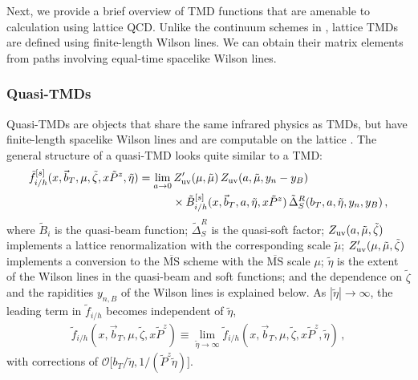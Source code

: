 \documentclass[11pt,a4paper]{article}
\newcommand{\MSbar}{{\overline{\mathrm{MS}}}}
\newcommand{\cO}{\mathcal{O}}
\newcommand{\nn}{\nonumber}
\newcommand{\bt}{\vec b_T}
\begin{document}
Next, we provide a brief overview of TMD functions that are amenable to calculation using lattice QCD.
Unlike the continuum schemes in , lattice TMDs are defined using
finite-length Wilson lines.
We can obtain their matrix elements from paths involving equal-time spacelike Wilson lines.

\subsubsection{Quasi-TMDs}
\label{sec:quasi-scheme}

Quasi-TMDs are objects that share the same infrared physics as TMDs, but have finite-length spacelike Wilson lines and are computable on the lattice \cite{Ji:2018hvs,Ebert:2019okf}. 
The general structure of a quasi-TMD looks quite similar to a TMD: 
\begin{align} \label{eq:qtmdpdf}
 \tilde f_{i/h}^{[s]}(x, \bt, \mu, \tilde\zeta, x \tilde P^z, \tilde\eta)
& = \lim_{a\to0} Z'_{\rm uv}(\mu,\tilde \mu)\, Z_{\rm uv}(a, \tilde\mu,y_n-y_B)
 \nn\\
%
&  \qquad \quad \times 
\tilde B_{i/h}^{[s]}(x, \bt, a,\tilde \eta, x \tilde P^z)\, \tilde\Delta_S^R(b_T, a, \tilde\eta, y_n, y_B)
\,,\end{align}
where $\tilde B_i$ is the quasi-beam function; $\tilde\Delta_S^R$ is the quasi-soft factor;
$Z_{\rm uv}(a, \tilde\mu,\tilde\zeta)$ implements a lattice renormalization with the corresponding scale $\tilde\mu$;
$Z'_{\rm uv}(\mu,\tilde \mu,\tilde\zeta)$ implements a conversion to the $\MSbar$ scheme
with the $\MSbar$ scale $\mu$;
$\tilde \eta$ is the extent of the Wilson lines in the quasi-beam and soft functions;
and the dependence on $\tilde\zeta$ and the rapidities $y_{n,B}$ of the Wilson lines is explained below.
As $|\tilde \eta| \to \infty$, the leading term in  $\tilde f_{i/h}$ becomes independent of $\tilde \eta$,
\begin{align}
	\tilde f_{i/h}(x, \bt, \mu, \tilde\zeta, x \tilde P^z) \equiv \lim_{\tilde \eta\to\infty}\tilde f_{i/h}(x, \bt, \mu, \tilde\zeta, x \tilde P^z, \tilde\eta)
\,,\end{align}
with corrections of $\cO\bigl[{b_T}/{\tilde\eta}, {1}/{(\tilde P^z \tilde\eta)}\bigr]$.
\end{document}

